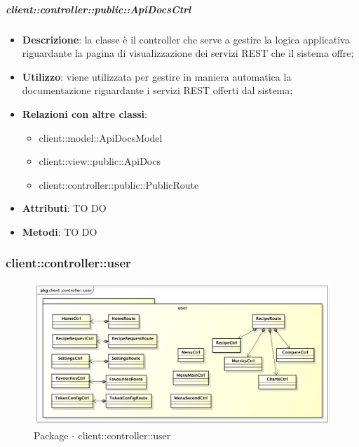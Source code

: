 		\subparagraph{client::controller::public::ApiDocsCtrl} %
		\label{subp:bdsm_app_client_controller_public_apidocsctrl}
		\begin{itemize}
			\item \textbf{Descrizione}: la classe è il controller che serve a gestire la logica applicativa riguardante la pagina di visualizzazione dei servizi REST che il sistema offre;
			\item \textbf{Utilizzo}: viene utilizzata per gestire in maniera automatica la documentazione riguardante i servizi REST offerti dal sistema;
			\item \textbf{Relazioni con altre classi}:
				\begin{itemize}
					\item client::model::ApiDocsModel
					\item client::view::public::ApiDocs
					\item client::controller::public::PublicRoute
				\end{itemize}
			\item \textbf{Attributi}: TO DO
			\item \textbf{Metodi}: TO DO
		\end{itemize}





\subsubsection{client::controller::user} %
\label{ssub:bdsm_app_client_controller_user}
\begin{figure}[htbp]
	\centering
	\centerline{\includegraphics[scale=0.45]{./images/client/client_controller_user.pdf}}
	\caption{Package - client::controller::user}
\end{figure}

